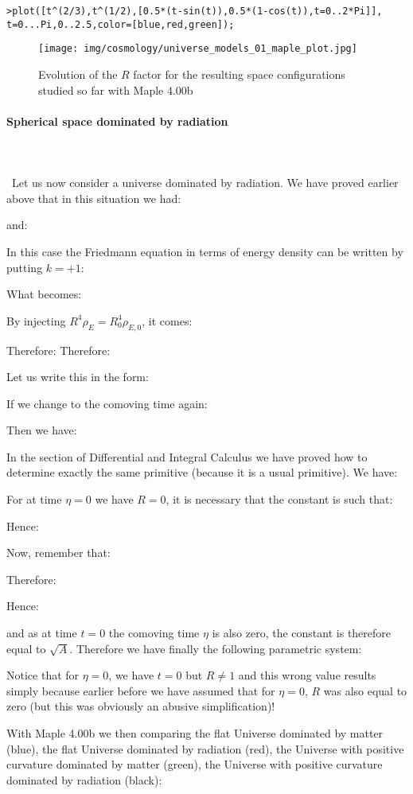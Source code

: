 	\texttt{>plot([t\string^(2/3),t\string^(1/2),[0.5*(t-sin(t)),0.5*(1-cos(t)),t=0..2*Pi]],\\
	t=0...Pi,0..2.5,color=[blue,red,green]);}
	\begin{figure}[H]
		\centering
		\texttt{[image: img/cosmology/universe\_models\_01\_maple\_plot.jpg]}
		\caption[]{Evolution of the $R$ factor for the resulting space configurations studied so far with Maple 4.00b}
	\end{figure}
	
	\paragraph{Spherical space dominated by radiation}\mbox{}\\\\\
	Let us now consider a universe dominated by radiation. We have proved earlier above that in this situation we had:
	
	and:
	
	In this case the Friedmann equation in terms of energy density can be written by putting $k=+1$:
	
	What becomes:
	
	By injecting $R^4\rho_E=R_0^4\rho_{E,0}$, it comes:
	
	Therefore:
	Therefore:
	
	Let us write this in the form:
		
	If we change to the comoving time again:
	
	Then we have:
		
	In the section of Differential and Integral Calculus we have proved how to determine exactly the same primitive (because it is a usual primitive). We have:
	
	For at time $\eta=0$ we have $R=0$, it is necessary that the constant is such that:
	
	Hence:
	
	Now, remember that:
	
	Therefore:
	
	Hence:
	
	and as at time $t=0$ the comoving time $\eta$ is also zero, the constant is therefore equal to $\sqrt{A}$. Therefore we have finally the following parametric system:
	
	\begin{tcolorbox}[title=Remark,colframe=black,arc=10pt]
	Notice that for $\eta=0$, we have $t=0$ but $R\neq 1$ and this wrong value results simply because earlier before we have assumed that for $\eta=0$, $R$ was also equal to zero (but this was obviously an abusive simplification)!
	\end{tcolorbox}
	With Maple 4.00b we then comparing the flat Universe dominated by matter (blue), the flat Universe dominated by radiation (red), the Universe with positive curvature dominated by matter (green), the Universe with positive curvature dominated by radiation (black):\\
	
